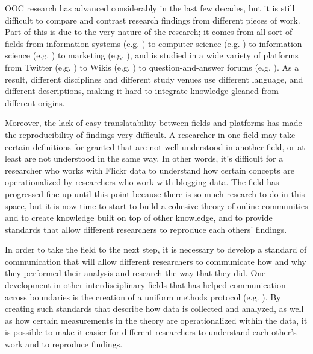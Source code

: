 OOC research has advanced considerably in the last few decades, but it is still difficult to compare and contrast research findings from different pieces of work.   Part of this is due to the very nature of the research; it comes from all sort of fields from information systems (e.g. \cite{ma07through}) to computer science (e.g. \cite{shneiderman00creating}) to information science (e.g. \cite{preece00online}) to marketing (e.g. \cite{kozinets02field}), and is studied in a wide variety of platforms from Twitter (e.g. \cite{vieweg10microblogging}) to Wikis (e.g. \cite{beschastnikh08wikipedian}) to question-and-answer forums (e.g. \cite{zhang07expertise}).  As a result, different disciplines and different study venues use different language, and different descriptions, making it hard to integrate knowledge gleaned from different origins.

Moreover, the lack of easy translatability between fields and platforms has made the reproducibility of findings very difficult.  A researcher in one field may take certain definitions for granted that are not well understood in another field, or at least are not understood in the same way.  In other words, it's difficult for a researcher who works with Flickr data to understand how certain concepts are operationalized by researchers who work with blogging data. The field has progressed fine up until this point because there is so much research to do in this space, but it is now time to start to build a cohesive theory of online communities and to create knowledge built on top of other knowledge, and to provide standards that allow different researchers to reproduce each others'
findings.

In order to take the field to the next step, it is necessary to develop a standard of communication that will allow different researchers to communicate how and why they performed their analysis and research the way that they did.  One development in other interdisciplinary fields that has helped communication across boundaries is the creation of a uniform methods protocol (e.g. \cite{grimm10odd}).  By creating such standards that describe how data is collected and analyzed, as well as how certain measurements in the theory are operationalized within the data, it is possible to make it easier for different researchers to understand each other's work and to reproduce findings.
